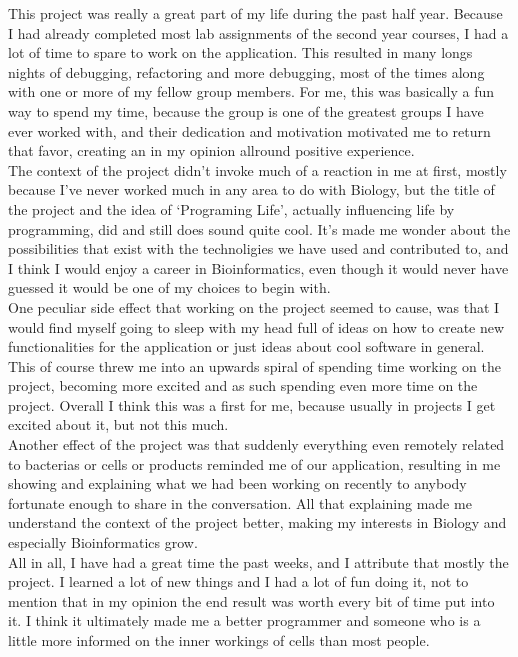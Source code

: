 	This project was really a great part of my life during the past half year. Because I had already completed most lab assignments of the second year courses, I had a lot of time to spare to work on the application. This resulted in many longs nights of debugging, refactoring and more debugging, most of the times along with one or more of my fellow group members. For me, this was basically a fun way to spend my time, because the group is one of the greatest groups I have ever worked with, and their dedication and motivation motivated me to return that favor, creating an in my opinion allround positive experience.\\

	The context of the project didn't invoke much of a reaction in me at first, mostly because I've never worked much in any area to do with Biology, but the title of the project and the idea of `Programing Life', actually influencing life by programming, did and still does sound quite cool. It's made me wonder about the possibilities that exist with the technoligies we have used and contributed to, and I think I would enjoy a career in Bioinformatics, even though it would never have guessed it would be one of my choices to begin with.\\

	One peculiar side effect that working on the project seemed to cause, was that I would find myself going to sleep with my head full of ideas on how to create new functionalities for the application or just ideas about cool software in general. This of course threw me into an upwards spiral of spending time working on the project, becoming more excited and as such spending even more time on the project. Overall I think this was a first for me, because usually in projects I get excited about it, but not this much.\\

	Another effect of the project was that suddenly everything even remotely related to bacterias or cells or products reminded me of our application, resulting in me showing and explaining what we had been working on recently to anybody fortunate enough to share in the conversation. All that explaining made me understand the context of the project better, making my interests in Biology and especially Bioinformatics grow.\\

	All in all, I have had a great time the past weeks, and I attribute that mostly the project. I learned a lot of new things and I had a lot of fun doing it, not to mention that in my opinion the end result was worth every bit of time put into it. I think it ultimately made me a better programmer and someone who is a little more informed on the inner workings of cells than most people.
